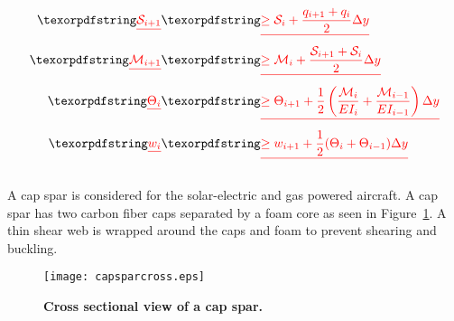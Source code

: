 \DIFdelbegin {}%
\DIFdel{-}%

\begin{eqnarray*}
    \DIFdel{\label{e:sheargp}
    \mathcal{S}_{i+1} }&\DIFdel{\geq \mathcal{S}_i + \frac{q_{i+1} + q_i}{2} \Delta y }\\
    \DIFdel{\label{e:momentgp}
    \mathcal{M}_{i+1} }&\DIFdel{\geq \mathcal{M}_i + \frac{\mathcal{S}_{i+1} + \mathcal{S}_i}{2} \Delta y }\\
    \DIFdel{\label{e:anglegp}
    \Theta_{i} }&\DIFdel{\geq \Theta_{i+1} + \frac{1}{2} \left(\frac{\mathcal{M}_i}{EI_i} + \frac{\mathcal{M}_{i-1}}{EI_{i-1}} \right) \Delta y }\\
    \DIFdel{\label{e:deflection}
    w_{i} }&\DIFdel{\geq w_{i+1} + \frac{1}{2} (\Theta_i + \Theta_{i-1}) \Delta y 
}\end{eqnarray*}


\subsubsection{}
\addtocounter{subsubsection}{-1}%

\DIFdelend A cap spar is considered for the solar-electric and gas powered aircraft.  \DIFdelbegin {}\DIFdelend A cap spar has two carbon fiber caps separated by a foam core as seen in Figure~\ref{f:capspar}. A thin shear web is wrapped around the caps and foam to prevent shearing and buckling.

\begin{figure}[H]
	\begin{center}
	\DIFdelbeginFL %
\DIFdelendFL \DIFaddbeginFL \texttt{[image: capsparcross.eps]}
    \DIFaddendFL \caption{\textbf{Cross sectional view of a cap spar.}}
	\label{f:capspar}
	\end{center}
\end{figure}

